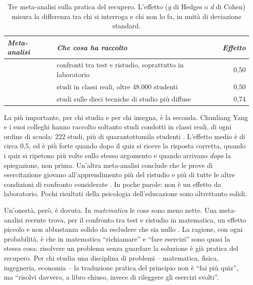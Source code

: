 \begin{table}[tbp]
  \centering\small
  \begin{tabular}{@{}>{\raggedright\arraybackslash}p{}>{\raggedright\arraybackslash}p{}r@{}}
    \toprule
    \textit{Meta-analisi} & \textit{Che cosa ha raccolto} & \textit{Effetto} \\
    \midrule
    \textcite{rowland2014} & 159 confronti tra test e ristudio, soprattutto in laboratorio & 0,50 \\
    \addlinespace
    \textcite{yang2021} & 222 studi in classi reali, oltre 48.000 studenti & 0,50 \\
    \addlinespace
    \textcite{donoghue2021} & studi sulle dieci tecniche di studio più diffuse & 0,74 \\
    \bottomrule
  \end{tabular}
  \caption{Tre meta-analisi sulla pratica del recupero. L'effetto
    (\emph{g} di Hedges o \emph{d} di Cohen) misura la differenza tra chi
    si interroga e chi non lo fa, in unità di deviazione standard.}
  \label{tab:metaanalisi}
\end{table}

La più importante, per chi studia e per chi insegna, è la seconda. Chunliang
Yang e i suoi colleghi hanno raccolto soltanto studi condotti in classi
reali, di ogni ordine di scuola: 222 studi, più di
quarantottomila studenti \parencite{yang2021}. L'effetto medio è di circa
0,5, ed è più forte quando dopo il quiz si riceve la risposta corretta,
quando i quiz si ripetono più volte sullo stesso argomento e quando
arrivano \emph{dopo} la spiegazione, non prima. Un'altra meta-analisi
conclude che le prove di esercitazione giovano all'apprendimento più
del ristudio e più di tutte le altre condizioni di confronto
considerate \parencite{adesope2017}. In poche parole: non è un effetto
da laboratorio. Pochi risultati della psicologia dell'educazione sono
altrettanto solidi.

Un'onestà, però, è dovuta. In \emph{matematica} le cose sono meno
nette. Una meta-analisi recente trova, per il confronto tra test e
ristudio in matematica, un effetto piccolo e non abbastanza solido da
escludere che sia nullo \parencite{murray2025}. La ragione, con ogni
probabilità, è che in matematica \enquote{richiamare} e \enquote{fare
esercizi} sono quasi la stessa cosa: risolvere un problema senza
guardare la soluzione è già pratica del recupero. Per chi studia una
disciplina di problemi -- matematica, fisica, ingegneria, economia --
la traduzione pratica del principio non è \enquote{fai più quiz}, ma
\enquote{risolvi davvero, a libro chiuso, invece di rileggere gli
esercizi svolti}.

